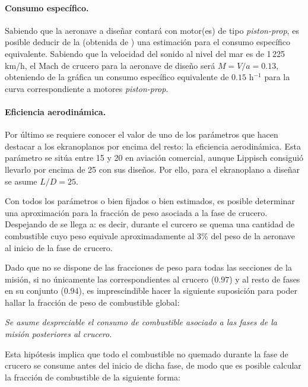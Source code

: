 \paragraph{Consumo específico.} Sabiendo que la aeronave a diseñar contará con motor(es) de tipo \emph{piston-prop}, es posible deducir de la  (obtenida de \cite{ref:raymer}) una estimación para el consumo específico equivalente. Sabiendo que la velocidad del sonido al nivel del mar es de 1\,225 km/h, el Mach de crucero para la aeronave de diseño será $M=V/a=0.13$, obteniendo de la gráfica un consumo específico equivalente de $0.15$ h$^{-1}$ para la curva correspondiente a motores \emph{piston-prop}.

\paragraph{Eficiencia aerodinámica.} Por último se requiere conocer el valor de uno de los parámetros que hacen destacar a los ekranoplanos por encima del resto: la eficiencia aerodinámica. Esta parámetro se sitúa entre 15 y 20 en aviación comercial, aunque Lippisch consiguió llevarlo por encima de 25 con sus diseños\cite{ref:wigpaper}. Por ello, para el ekranoplano a diseñar se asume $L/D = 25$.

Con todos los parámetros o bien fijados o bien estimados, es posible determinar una aproximación para la fracción de peso asociada a la fase de crucero. Despejando de  se llega a:
es decir, durante el curcero se quema una cantidad de combustible cuyo peso equivale aproximadamente al 3\% del peso de la aeronave al inicio de la fase de crucero.

Dado que no se dispone de las fracciones de peso para todas las secciones de la misión, si no únicamente las correspondientes al crucero ($0.97$) y al resto de fases en su conjunto ($0.94$), es imprescindible hacer la siguiente suposición para poder hallar la fracción de peso de combustible global:

\emph{Se asume despreciable el consumo de combustible asociado a las fases de la misión posteriores al crucero.}

Esta hipótesis implica que todo el combustible no quemado durante la fase de crucero se consume antes del inicio de dicha fase, de modo que es posible calcular la fracción de combustible de la siguiente forma:


